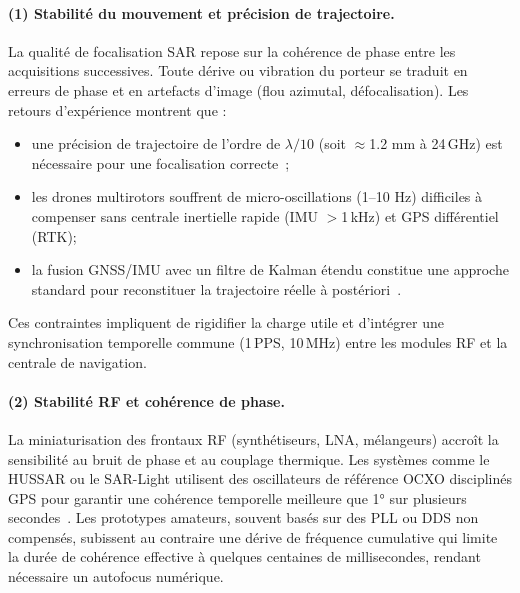 \paragraph{(1) Stabilité du mouvement et précision de trajectoire.}
La qualité de focalisation SAR repose sur la cohérence de phase entre les acquisitions successives.  
Toute dérive ou vibration du porteur se traduit en erreurs de phase et en artefacts d’image (flou azimutal, défocalisation).  
Les retours d’expérience montrent que :
\begin{itemize}
  \item une précision de trajectoire de l’ordre de \(\lambda/10\) (soit $\approx$1.2 mm à 24\,GHz) est nécessaire pour une focalisation correcte~\cite{Aguasca2013_ARBRES_UAV_SAR};
  \item les drones multirotors souffrent de micro-oscillations (1–10 Hz) difficiles à compenser sans centrale inertielle rapide (IMU $>$1\,kHz) et GPS différentiel (RTK);
  \item la fusion GNSS/IMU avec un filtre de Kalman étendu constitue une approche standard pour reconstituer la trajectoire réelle à postériori~\cite{Svedin2021_UAVSAR}.
\end{itemize}
Ces contraintes impliquent de rigidifier la charge utile et d’intégrer une synchronisation temporelle commune (1\,PPS, 10\,MHz) entre les modules RF et la centrale de navigation.

\paragraph{(2) Stabilité RF et cohérence de phase.}
La miniaturisation des frontaux RF (synthétiseurs, LNA, mélangeurs) accroît la sensibilité au bruit de phase et au couplage thermique.  
Les systèmes comme le HUSSAR ou le SAR-Light utilisent des oscillateurs de référence OCXO disciplinés GPS pour garantir une cohérence temporelle meilleure que 1° sur plusieurs secondes~\cite{HUSSAR2025,Angelliaume2022}.  
Les prototypes amateurs, souvent basés sur des PLL ou DDS non compensés, subissent au contraire une dérive de fréquence cumulative qui limite la durée de cohérence effective à quelques centaines de millisecondes, rendant nécessaire un autofocus numérique.

